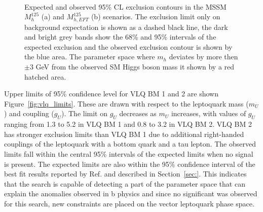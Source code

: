 \begin{figure}[!hbtp]
\centering
     \\
\caption{Expected and observed 95\% CL exclusion contours in the MSSM $M_{h}^{125}$ (a) and $M_{h,EFT}^{125}$ (b) scenarios. The exclusion limit only on background expectation is shown as a dashed black line, the dark and bright grey bands show the 68\% and 95\% intervals of the expected exclusion and the observed exclusion contour is shown by the blue area. The parameter space where $m_{h}$ deviates by more then $\pm$3  GeV from the observed SM Higgs boson mass it shown by a red hatched area.
}
\label{fig:mssm_limits}
\end{figure}

Upper limits of 95\% confidence level for VLQ BM 1 and 2 are shown Figure~\ref{fig:vlq_limits}. 
These are drawn with respect to the leptoquark mass ($m_{U}$) and coupling ($g_{U}$).
The limit on $g_{U}$ decreases as $m_{U}$ increases, with values of $g_U$ ranging from 1.3 to 5.2 in VLQ BM 1 and 0.8 to 3.2 in VLQ BM 2. 
VLQ BM 2 has stronger exclusion limits than VLQ BM 1 due to additional right-handed couplings of the leptoquark with a bottom quark and a tau lepton.
The observed limits fall within the central 95\% intervals of the expected limits when no signal is present. 
The expected limits are also within the 95\% confidence interval of the best fit results reported by Ref.\cite{Cornella:2021sby} and described in Section~\ref{sec:}.
This indicates that the search is capable of detecting a part of the parameter space that can explain the anomalies observed in b physics and since no significant was observed for this search, new constraints are placed on the vector leptoquark phase space. \\

